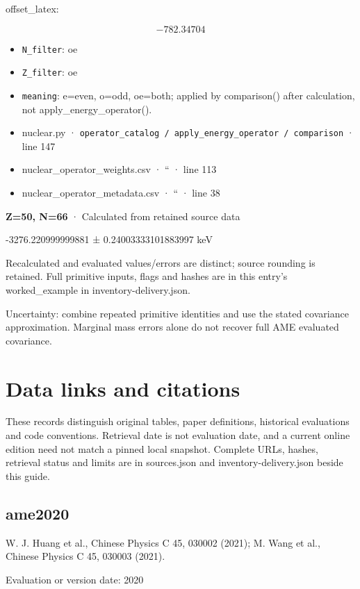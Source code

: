 \documentclass[
  11pt,
  letterpaper,
]{article}
\begin{document}
offset\_latex:

\[
-782.34704
\]

\begin{itemize}
\item
  \texttt{N\_filter}: oe
\item
  \texttt{Z\_filter}: oe
\item
  \texttt{meaning}: e=even, o=odd, oe=both; applied by comparison()
  after calculation, not apply\_energy\_operator().
\item
  nuclear.py ·
  \texttt{operator\_catalog\ /\ apply\_energy\_operator\ /\ comparison}
  · line 147
\item
  nuclear\_operator\_weights.csv · `` · line 113
\item
  nuclear\_operator\_metadata.csv · `` · line 38
\end{itemize}

\textbf{Z=50, N=66} · Calculated from retained source data

-3276.220999999881 ± 0.24003333101883997 keV

Recalculated and evaluated values/errors are distinct; source rounding
is retained. Full primitive inputs, flags and hashes are in this entry's
worked\_example in inventory-delivery.json.

Uncertainty: combine repeated primitive identities and use the stated
covariance approximation. Marginal mass errors alone do not recover full
AME evaluated covariance.

\section{Data links and citations}\label{data-links-and-citations}

These records distinguish original tables, paper definitions, historical
evaluations and code conventions. Retrieval date is not evaluation date,
and a current online edition need not match a pinned local snapshot.
Complete URLs, hashes, retrieval status and limits are in sources.json
and inventory-delivery.json beside this guide.

\subsection{ame2020}\label{ame2020}

W. J. Huang et al., Chinese Physics C 45, 030002 (2021); M. Wang et al.,
Chinese Physics C 45, 030003 (2021).

Evaluation or version date: 2020
\end{document}
